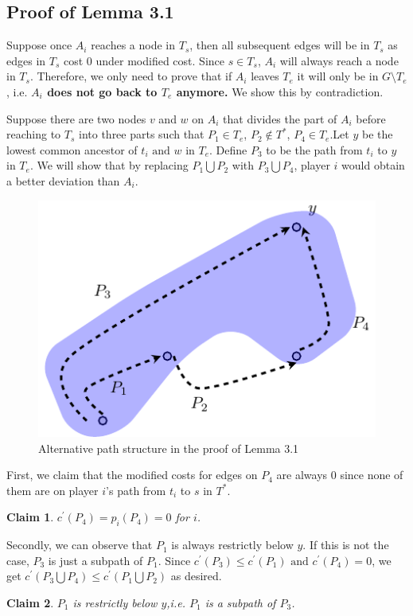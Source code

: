 \documentclass[11pt,psfig,times]{article}
\newtheorem{claim}{Claim}
\begin{document}
	
\subsection{Proof of Lemma 3.1}
Suppose once $A_i$ reaches a node in $T_s$, then all subsequent edges will be in $T_s$ as edges in $T_s$ cost 0 under modified cost. Since $s \in T_s$, $A_i$ will always reach a node in $T_s$. Therefore, we only need to prove that if $A_i$ leaves $T_e$ it will only be in $G\setminus T_e$, i.e. \textbf{$A_i$ does not go back to $T_e$ anymore.} We show this by contradiction. 

Suppose there are two nodes \(v\) and \(w\) on \(A_i\) that divides the part of $A_i$ before reaching to $T_s$ into three parts such that \(P_1 \in T_e\), \(P_2 \notin T^*\), \(P_4 \in T_e\).Let $y$ be the lowest common ancestor of $t_i \text{ and } w \text{ in } T_e$. Define $P_3$ to be the path from $t_i$ to $y$ in $T_e$. We will show that by replacing $P_1 \bigcup P_2$ with $P_3 \bigcup P_4$, player $i$ would obtain a better deviation than $A_i$.
		\begin{figure}		
		\begin{center}
		\includegraphics{pictures/alterpath.pdf}
		\end{center}
		\caption{Alternative path structure in the proof of Lemma 3.1}
		\label{fig:alterpath}
	\end{figure}

First, we claim that the modified costs for edges on $P_4$ are always 0 since none of them are on player $i$'s path from $t_i$ to $s$ in $T^*$.
		\begin{claim}
			$ c^{'}(P_4) = p_i(P_4) = 0$ for $i$.
		\end{claim}
Secondly, we can observe that $P_1$ is always restrictly below $y$. If this is not the case, $P_3$ is just a subpath of $P_1$. Since $c^{'}(P_3) \leq c^{'}(P_1) \text{ and } c^{'}(P_4) = 0$, we get $ c^{'}(P_3\bigcup P_4) \leq c^{'}(P_1\bigcup P_2)$ as desired.  	
		\begin{claim}
		$P_1$ is restrictly below $y$,i.e. $P_1$ is a subpath of $P_3$. 
		\end{claim}
\end{document}
